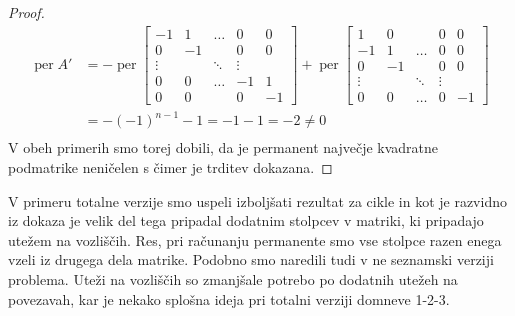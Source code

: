 \documentclass[12pt,a4paper,twoside]{article}
\theoremstyle{definition} %
\theoremstyle{plain} %
\numberwithin{equation}{section}  %
\DeclareMathOperator{\per}{per}
\begin{document}
\begin{proof}
\begin{equation*}
\begin{split}
 \per A' &=-\per\left[
\begin{matrix} 
 -1 & 1 & \ldots & 0 & 0 \\ 
 0 & -1 &  & 0 & 0 \\ 
 \vdots &  & \ddots & \vdots &  \\ 
 0 & 0 & \ldots & -1 & 1 \\
 0 & 0 &  & 0 & -1 
\end{matrix} \right]
+\per\left[
\begin{matrix} 
 1 & 0 &  & 0 & 0 \\
 -1 & 1 & \ldots & 0 & 0 \\  0 & -1 &  & 0 & 0 \\ 
  \vdots &  & \ddots & \vdots &  \\ 
 0 & 0 & \ldots & 0 & -1
\end{matrix} \right] \\
&=-(-1)^{n-1} -1 =  -1 - 1 = -2 \neq 0\\
\end{split}
\end{equation*}
V obeh primerih smo torej dobili, da je permanent največje kvadratne podmatrike neničelen s čimer je trditev dokazana.
\end{proof}
V primeru totalne verzije smo uspeli izboljšati rezultat za cikle in kot je razvidno iz dokaza je velik del tega pripadal dodatnim stolpcev v matriki, ki pripadajo utežem na vozliščih. Res, pri računanju permanente smo vse stolpce razen enega vzeli iz drugega dela matrike. Podobno smo naredili tudi v ne seznamski verziji problema. Uteži na vozliščih so zmanjšale potrebo po dodatnih utežeh na povezavah, kar je nekako splošna ideja pri totalni verziji domneve 1-2-3.
\end{document}
